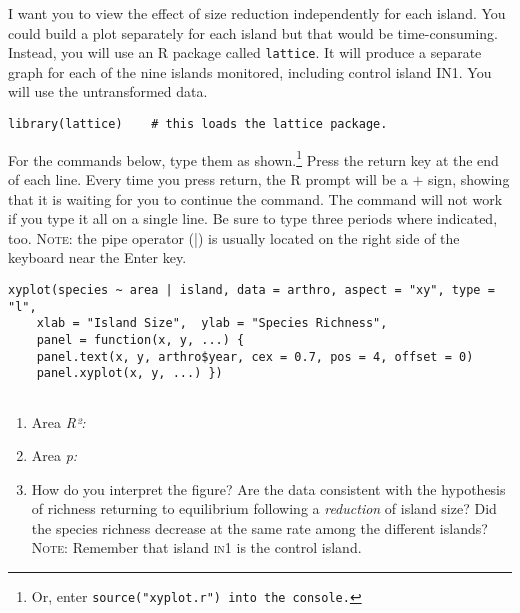 \documentclass[11pt]{article}
\begin{document}
I want you to view the effect of size reduction independently for each island.  You could build a plot separately for each island but that would be time-consuming.  Instead, you will use an R package called \texttt{lattice}.  It will produce a separate graph for each of the nine islands monitored, including control island IN1. You will use the untransformed data.


\begin{verbatim}
library(lattice)	# this loads the lattice package.
\end{verbatim}


For the commands below, type them as shown.\footnote{Or, enter \texttt{source("xyplot.r") into the console.}} Press the return key at the end of each line. Every time you press return, the R prompt will be a $+$ sign, showing that it is waiting for you to continue the command.  The command will not work if you type it all on a single line. Be sure to type three periods where indicated, too. \textsc{Note:} the pipe operator (|) is usually located on the right side of the keyboard near the Enter key.

\begin{verbatim}
xyplot(species ~ area | island, data = arthro, aspect = "xy", type = "l", 
    xlab = "Island Size",  ylab = "Species Richness", 
    panel = function(x, y, ...) {
    panel.text(x, y, arthro$year, cex = 0.7, pos = 4, offset = 0)
    panel.xyplot(x, y, ...) })
    
\end{verbatim}

\begin{enumerate}[resume]
	\item  Area \textit{R²:} 
	
	\item Area \textit{p:}
	
	\item How do you interpret the figure? Are the data consistent with the hypothesis of richness returning to equilibrium following a \textit{reduction} of island size? Did the species richness decrease at the same rate among the different islands? \textsc{Note:} Remember that island \textsc{in1} is the control island.
	
\end{enumerate}
\end{document}
